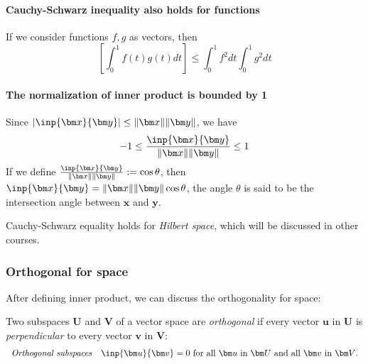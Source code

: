 \begin{remark}
\paragraph{Cauchy-Schwarz inequality also holds for functions}
If we consider functions $f,g$ as vectors, then
\[
\left[
\int_0^1f(t)g(t)dt
\right]\le
\int_0^1f^2dt\int_0^1g^2dt
\]
\paragraph{The normalization of inner product is bounded by 1}
Since $|\inp{\bm x}{\bm y}|\le\|\bm x\|\|\bm y\|$, we have 
\[
-1\le\frac{\inp{\bm x}{\bm y}}{\|\bm x\|\|\bm y\|}\le 1
\]
If we define $\frac{\inp{\bm x}{\bm y}}{\|\bm x\|\|\bm y\|}:=\cos\theta$, then $\inp{\bm x}{\bm y}=\|\bm x\|\|\bm y\|\cos\theta$, the angle $\theta$ is said to be the intersection angle between $\bm x$ and $\bm y$.
\end{remark}
Cauchy-Schwarz equality holds for \emph{Hilbert space}, which will be discussed in other courses.

\subsubsection{Orthogonal for space}
After defining inner product, we can discuss the orthogonality for space:
\begin{definition}
Two subspaces $\bm U$ and $\bm V$ of a vector space are \emph{orthogonal} if every vector $\bm u$ in $\bm U$ is \textit{perpendicular} to every vector $\bm v$ in $\bm V$:
\[
\begin{array}{ll}
\mbox{\emph{Orthogonal subspaces}}
&
\inp{\bm u}{\bm v}=0\mbox{ for all $\bm u$ in $\bm U$ and all $\bm v$ in $\bm V$.}
\end{array}
\]
\end{definition}